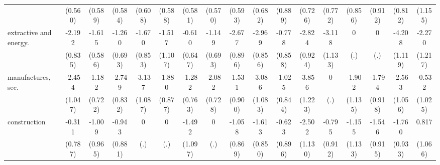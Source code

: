 {\begin{tabular}{l*{16}{c}}
                    &     (0.560)         &     (0.589)         &     (0.584)         &     (0.608)         &     (0.588)         &     (0.581)         &     (0.570)         &     (0.593)         &     (0.682)         &     (0.889)         &     (0.726)         &     (0.772)         &     (0.856)         &     (0.912)         &     (0.812)         &     (1.155)         \\
[1em]
extractive and energy.&      -2.192\sym{**} &      -1.615\sym{**} &      -1.260         &      -1.670         &      -1.517         &      -0.610         &      -1.149         &      -2.677\sym{**} &      -2.969\sym{***}&      -0.778         &      -2.824\sym{**} &      -3.118\sym{**} &           0         &           0         &      -4.208\sym{***}&      -2.270         \\
                    &     (0.835)         &     (0.586)         &     (0.693)         &     (0.853)         &     (1.107)         &     (0.647)         &     (0.693)         &     (0.896)         &     (0.856)         &     (0.858)         &     (0.924)         &     (1.133)         &         (.)         &         (.)         &     (1.119)         &     (1.217)         \\
[1em]
manufactures, sec.  &      -2.454\sym{*}  &      -1.182         &      -2.749\sym{***}&      -3.137\sym{**} &      -1.880\sym{*}  &      -1.282         &      -2.082\sym{**} &      -1.531         &      -3.086\sym{**} &      -1.025         &      -3.856\sym{**} &           0         &      -1.902         &      -1.794         &      -2.563\sym{*}  &      -0.532         \\
                    &     (1.047)         &     (0.722)         &     (0.832)         &     (1.087)         &     (0.877)         &     (0.763)         &     (0.728)         &     (0.900)         &     (1.083)         &     (0.844)         &     (1.223)         &         (.)         &     (1.135)         &     (0.918)         &     (1.056)         &     (1.025)         \\
[1em]
construction        &      -0.311         &      -1.009         &      -0.943         &           0         &           0         &      -1.492         &           0         &      -1.058         &      -1.613         &      -0.623         &      -2.502\sym{*}  &      -0.795         &      -1.155         &      -1.546         &      -1.760         &       0.817         \\
                    &     (0.787)         &     (0.965)         &     (0.881)         &         (.)         &         (.)         &     (1.097)         &         (.)         &     (0.869)         &     (0.850)         &     (0.896)         &     (1.130)         &     (0.912)         &     (1.133)         &     (0.915)         &     (0.933)         &     (1.066)         \\

\end{tabular}}
